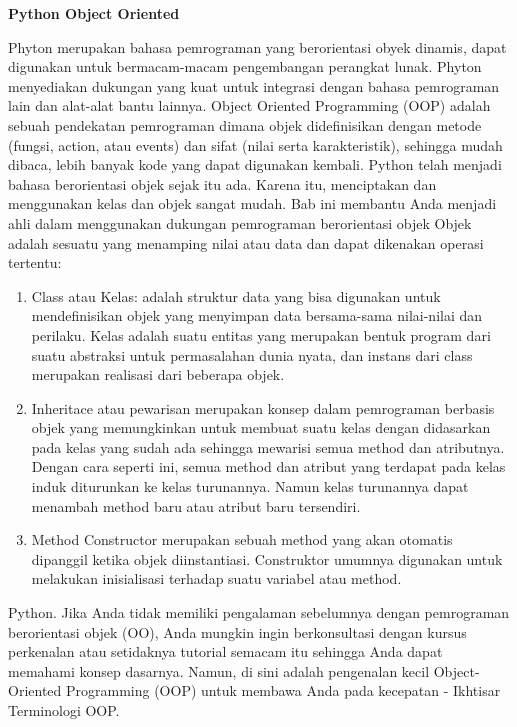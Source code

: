 \sloppy
\begin{center}{\fontsize{16pt}{16pt}\selectfont \textbf{Python Object Oriented} \\}\end{center} \par
Phyton merupakan bahasa pemrograman yang berorientasi obyek dinamis, dapat digunakan untuk bermacam-macam pengembangan perangkat lunak. Phyton menyediakan dukungan yang kuat untuk integrasi dengan bahasa pemrograman lain dan alat-alat bantu lainnya.
Object Oriented Programming (OOP) adalah sebuah pendekatan pemrograman dimana objek didefinisikan dengan metode (fungsi, action, atau events) dan sifat (nilai serta karakteristik), sehingga mudah dibaca, lebih banyak kode yang dapat digunakan kembali.
Python telah menjadi bahasa berorientasi objek sejak itu ada. Karena itu, menciptakan dan menggunakan kelas dan objek sangat mudah. Bab ini membantu Anda menjadi ahli dalam menggunakan dukungan pemrograman berorientasi objek
Objek adalah sesuatu yang menamping nilai atau data dan dapat dikenakan operasi tertentu:
\begin {enumerate}
\item Class atau Kelas: adalah struktur data yang bisa digunakan untuk mendefinisikan objek yang menyimpan data bersama-sama nilai-nilai dan perilaku. Kelas adalah suatu entitas yang merupakan bentuk program dari suatu abstraksi untuk permasalahan dunia nyata, dan instans dari class merupakan realisasi dari beberapa objek.
\item Inheritace atau pewarisan merupakan konsep dalam pemrograman berbasis objek yang memungkinkan untuk membuat suatu kelas dengan didasarkan pada kelas yang sudah ada sehingga mewarisi semua method dan atributnya. Dengan cara seperti ini, semua method dan atribut yang terdapat pada kelas induk diturunkan ke kelas turunannya. Namun kelas turunannya dapat menambah method baru atau atribut baru tersendiri.
\item Method Constructor merupakan sebuah method yang akan otomatis dipanggil ketika objek diinstantiasi. Construktor umumnya digunakan untuk melakukan inisialisasi terhadap suatu variabel atau method.
\end {enumerate} \par

Python. Jika Anda tidak memiliki pengalaman sebelumnya dengan pemrograman berorientasi objek (OO), Anda mungkin  ingin berkonsultasi dengan kursus perkenalan atau setidaknya tutorial semacam itu sehingga Anda dapat memahami konsep dasarnya. Namun, di sini adalah pengenalan kecil Object-Oriented Programming (OOP) untuk membawa Anda pada kecepatan - Ikhtisar Terminologi OOP. 

